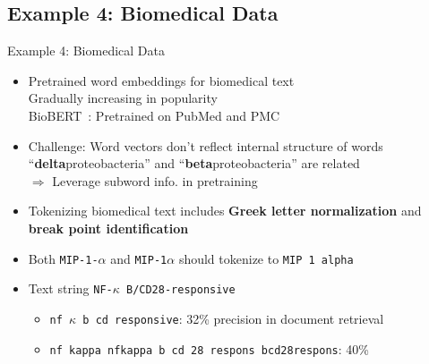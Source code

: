 \documentclass{beamer}
\renewcommand{\cite}{\citep}
\begin{document}
\subsection{Example 4: Biomedical Data}







\begin{frame}{Example 4: Biomedical Data}
\begin{itemize}
\item Pretrained word embeddings for biomedical text\\ 
	Gradually increasing in popularity~\cite{wang2018comparison}\\
	BioBERT~\cite{lee2020biobert}: Pretrained on PubMed and PMC
\item Challenge: Word vectors don't reflect internal structure of words\\
	``\textbf{delta}proteobacteria'' and ``\textbf{beta}proteobacteria'' are related\\
	$\Rightarrow$ Leverage subword info. in pretraining~\cite{zhang2019biowordvec}
	\bigskip
\item Tokenizing biomedical text includes \textbf{Greek letter normalization} and \textbf{break point identification}~\cite{jiang2007empirical}
\item Both \texttt{MIP-{\color{red}1-$\alpha$}} and \texttt{MIP-{\color{red}1$\alpha$}} should tokenize to \texttt{MIP 1 alpha}
\item Text string \texttt{NF-$\kappa$ B/CD28-responsive}{\small~\cite{trieschnigg2007influence}}
	\begin{itemize}
	\small
	\item \texttt{nf $\kappa$ b cd responsive}: 32\% precision in document retrieval
	\item \texttt{nf kappa nfkappa b cd 28 respons bcd28respons}: 40\%
	\end{itemize}
\end{itemize}
\end{frame}
\end{document}
